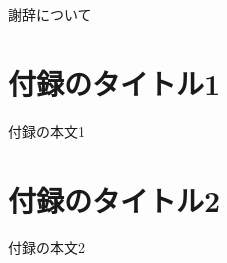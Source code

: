 \documentclass[originalpaper]{jpnsecart}      %
\begin{document}
\begin{acknowledgment}
謝辞について
\end{acknowledgment}




\appendix

\section{付録のタイトル1}

付録の本文1

\section{付録のタイトル2}

付録の本文2

\begin{biography}
\end{biography}
\end{document}
